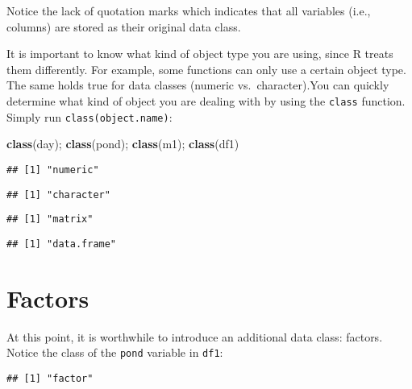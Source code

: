 \documentclass[]{book}
\newenvironment{Shaded}{\begin{snugshade}}{\end{snugshade}}
\newcommand{\KeywordTok}[1]{\textcolor[rgb]{0.13,0.29,0.53}{\textbf{#1}}}
\newcommand{\OperatorTok}[1]{\textcolor[rgb]{0.81,0.36,0.00}{\textbf{#1}}}
\newcommand{\NormalTok}[1]{#1}
\theoremstyle{definition}
\theoremstyle{definition}
\theoremstyle{definition}
\theoremstyle{remark}
\begin{document}
Notice the lack of quotation marks which indicates that all variables
(i.e., columns) are stored as their original data class.

It is important to know what kind of object type you are using, since R
treats them differently. For example, some functions can only use a
certain object type. The same holds true for data classes (numeric
vs.~character).You can quickly determine what kind of object you are
dealing with by using the \texttt{class} function. Simply run
\texttt{class(object.name)}:

\begin{Shaded}
\begin{Highlighting}[]
\KeywordTok{class}\NormalTok{(day); }\KeywordTok{class}\NormalTok{(pond); }\KeywordTok{class}\NormalTok{(m1); }\KeywordTok{class}\NormalTok{(df1)}
\end{Highlighting}
\end{Shaded}

\begin{verbatim}
## [1] "numeric"
\end{verbatim}

\begin{verbatim}
## [1] "character"
\end{verbatim}

\begin{verbatim}
## [1] "matrix"
\end{verbatim}

\begin{verbatim}
## [1] "data.frame"
\end{verbatim}

\section{Factors}\label{factors}

At this point, it is worthwhile to introduce an additional data class:
factors. Notice the class of the \texttt{pond} variable in \texttt{df1}:

\begin{Shaded}
\end{Shaded}

\begin{verbatim}
## [1] "factor"
\end{verbatim}
\end{document}

